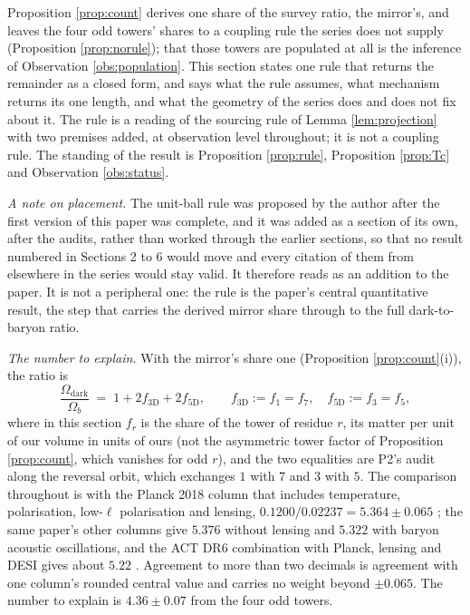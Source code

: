 \documentclass[11pt]{article}
\theoremstyle{definition}
\begin{document}
Proposition \ref{prop:count} derives one share of the survey ratio, the mirror's, and leaves the four odd towers' shares to a coupling rule the series does not supply (Proposition \ref{prop:norule}); that those towers are populated at all is the inference of Observation \ref{obs:population}. This section states one rule that returns the remainder as a closed form, and says what the rule assumes, what mechanism returns its one length, and what the geometry of the series does and does not fix about it. The rule is a reading of the sourcing rule of Lemma \ref{lem:projection} with two premises added, at observation level throughout; it is not a coupling rule. The standing of the result is Proposition \ref{prop:rule}, Proposition \ref{prop:Tc} and Observation \ref{obs:status}.

\emph{A note on placement.} The unit-ball rule was proposed by the author after the first version of this paper was complete, and it was added as a section of its own, after the audits, rather than worked through the earlier sections, so that no result numbered in Sections 2 to 6 would move and every citation of them from elsewhere in the series would stay valid. It therefore reads as an addition to the paper. It is not a peripheral one: the rule is the paper's central quantitative result, the step that carries the derived mirror share through to the full dark-to-baryon ratio.

\emph{The number to explain.} With the mirror's share one (Proposition \ref{prop:count}(i)), the ratio is
\begin{equation}\label{eq:sum}
\frac{\Omega_{\mathrm{dark}}}{\Omega_{b}} \;=\; 1 + 2 f_{3\mathrm{D}} + 2 f_{5\mathrm{D}}, \qquad f_{3\mathrm{D}} := f_{1} = f_{7}, \quad f_{5\mathrm{D}} := f_{3} = f_{5},
\end{equation}
where in this section $f_{r}$ is the share of the tower of residue $r$, its matter per unit of our volume in units of ours (not the asymmetric tower factor of Proposition \ref{prop:count}, which vanishes for odd $r$), and the two equalities are P2's audit along the reversal orbit, which exchanges $1$ with $7$ and $3$ with $5$. The comparison throughout is with the Planck 2018 column that includes temperature, polarisation, low-$\ell$ polarisation and lensing, $0.1200/0.02237 = 5.364 \pm 0.065$ \cite{Planck2018}; the same paper's other columns give $5.376$ without lensing and $5.322$ with baryon acoustic oscillations, and the ACT DR6 combination with Planck, lensing and DESI gives about $5.22$ \cite{ACTDR6}. Agreement to more than two decimals is agreement with one column's rounded central value and carries no weight beyond $\pm 0.065$. The number to explain is $4.36 \pm 0.07$ from the four odd towers.
\end{document}
